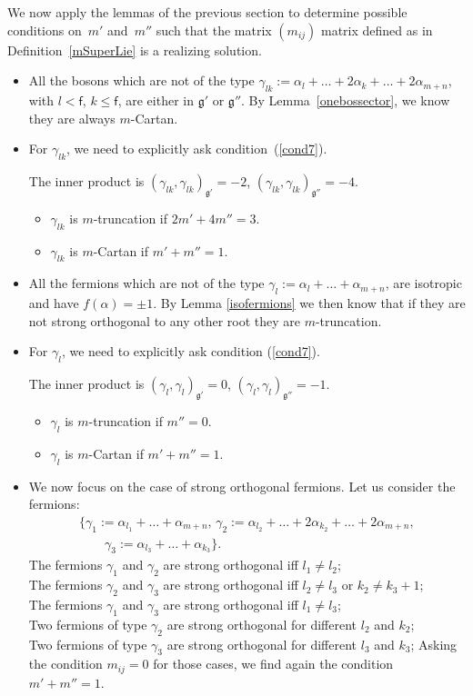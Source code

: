 \documentclass[10pt,a4paper]{amsart}
\numberwithin{equation}{section}
\newcommand{\g}{\mathfrak{g}}
\newcommand{\f}{\mathsf{f}}
\begin{document}
We now apply the lemmas of the previous section to determine possible conditions on~$m'$ and~$m''$ such that the matrix $(m_{ij})$ matrix defined as in Definition~\ref{mSuperLie} is a realizing solution.
\begin{itemize}\itemsep=0pt
	\item All the bosons which are not of the type $\gamma_{lk}:= \alpha_l+ \dots +2\alpha_{k}+\dots +2\alpha_{m+n}$, with $l < \f$, $k\leq \f$, are either in $\mathfrak{g'}$ or $\mathfrak{g''}$. By Lemma~\ref{onebossector}, we know they are always $m$-Cartan.
	\item For $\gamma_{lk}$, we need to explicitly ask condition~(\ref{cond7}).

The inner product is $(\gamma_{lk},\gamma_{lk})_{\g'}= -2$, $(\gamma_{lk},\gamma_{lk})_{\g''}= -4$.
	\begin{itemize}\itemsep=0pt
	\item $\gamma_{lk}$ is $m$-truncation if $2m' +4m'' =3$.
	\item $\gamma_{lk}$ is $m$-Cartan if $m'+m'' = 1$.
	\end{itemize}
	\item All the fermions which are not of the type $\gamma_{l}:= \alpha_l+ \dots +\alpha_{m+n}$, are isotropic and have $f(\alpha)= \pm 1$. By Lemma \ref{isofermions} we then know that if they are not strong orthogonal to any other root they are $m$-truncation.
	\item For $\gamma_{l}$, we need to explicitly ask condition (\ref{cond7}).

The inner product is $(\gamma_{l},\gamma_{l})_{\g'}=0$, $(\gamma_{l},\gamma_{l})_{\g''}= -1$.
	\begin{itemize}\itemsep=0pt
	\item $\gamma_{l}$ is $m$-truncation if $m'' =0$.
	\item $\gamma_{l}$ is $m$-Cartan if $m'+m'' = 1$.
	\end{itemize}
\item We now focus on the case of strong orthogonal fermions. Let us consider the fermions:
\begin{gather*} \big\lbrace \gamma_1 := \alpha_{l_1}+ \dots +\alpha_{m+n},\,
 \gamma_2:=\alpha_{l_2}+ \dots +2\alpha_{k_2}+\dots +2\alpha_{m+n},\\
 \qquad
  \gamma_3:= \alpha_{l_3}+ \dots +\alpha_{k_3} \big\rbrace.			
\end{gather*}
	The fermions $\gamma_1$ and $\gamma_2$ are strong orthogonal iff $l_1\neq l_2$;\\
	The fermions $\gamma_2$ and $\gamma_3$ are strong orthogonal iff $l_2\neq l_3$ or $k_2\neq k_3+1$;\\
	The fermions $\gamma_1$ and $\gamma_3$ are strong orthogonal iff $l_1\neq l_3$;\\
	Two fermions of type $\gamma_2$ are strong orthogonal for different $l_2$ and $k_2$;\\
	Two fermions of type $\gamma_3$ are strong orthogonal for different $l_3$ and $k_3$;
	Asking the condition $m_{ij}=0$ for those cases, we find again the condition $m'+m''=1$.
\end{itemize}		
\end{document}

